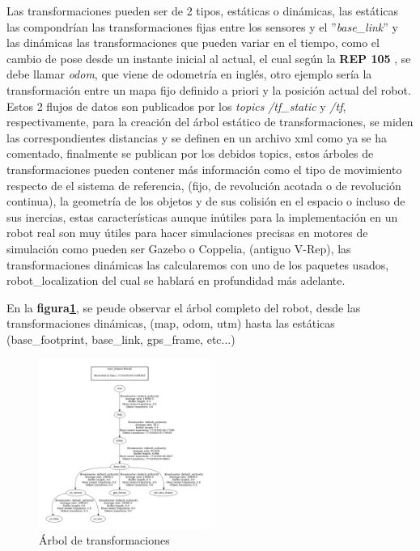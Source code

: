 Las transformaciones pueden ser de 2 tipos, estáticas o dinámicas, las estáticas las compondrían las transformaciones fijas entre los 
sensores y el ''\textit{base\_link}'' y las dinámicas las transformaciones que pueden variar en el tiempo, como el cambio de pose desde 
un instante inicial al actual, el cual según la \textbf{REP 105} , se debe llamar \textit{odom}, que viene de odometría en inglés, otro 
ejemplo sería la transformación entre un mapa fijo definido a priori y la posición actual del robot. Estos 2 flujos de datos son publicados 
por los \textit{topics} \textit{/tf\_static} y \textit{/tf}, respectivamente, para la creación del árbol estático de transformaciones, se 
miden las correspondientes distancias y se definen en un archivo xml como ya se ha comentado, finalmente se publican por los debidos topics, 
estos árboles de transformaciones pueden contener más información como el tipo de movimiento respecto de el sistema de referencia, 
(fijo, de revolución acotada o de revolución continua), la geometría de los objetos y de sus colisión en el espacio o incluso de sus 
inercias, estas características aunque inútiles para la implementación en un robot real son muy útiles para hacer simulaciones precisas 
en motores de simulación como pueden ser Gazebo o Coppelia, (antiguo V-Rep), las transformaciones dinámicas las calcularemos con uno de 
los paquetes usados, robot\_localization del cual se hablará en profundidad más adelante.

En la  \textbf{figura\ref{fig:arbol_urdf}}, se peude observar el árbol completo del robot, desde las transformaciones dinámicas, 
(map, odom, utm) hasta las estáticas (base\_footprint, base\_link, gps\_frame, etc...)

\begin{figure}[H]
    \centering
    \includegraphics[width=0.5\textwidth]{images/arbol_transformaciones_hunter.jpg}
    \caption{Árbol de transformaciones}
    \label{fig:arbol_urdf}
\end{figure}

